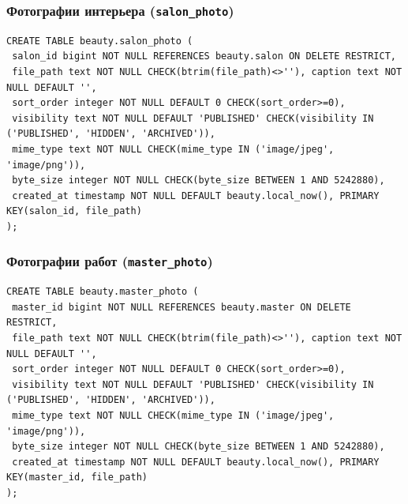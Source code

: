 \documentclass[11pt,a4paper]{article}
\begin{document}
\par\medskip\noindent\begin{minipage}{\linewidth}
\subsubsection*{Фотографии интерьера (\texttt{salon\_\allowbreak{}photo})}
\begin{lstlisting}[style=sql]
CREATE TABLE beauty.salon_photo (
 salon_id bigint NOT NULL REFERENCES beauty.salon ON DELETE RESTRICT,
 file_path text NOT NULL CHECK(btrim(file_path)<>''), caption text NOT NULL DEFAULT '',
 sort_order integer NOT NULL DEFAULT 0 CHECK(sort_order>=0),
 visibility text NOT NULL DEFAULT 'PUBLISHED' CHECK(visibility IN ('PUBLISHED', 'HIDDEN', 'ARCHIVED')),
 mime_type text NOT NULL CHECK(mime_type IN ('image/jpeg', 'image/png')),
 byte_size integer NOT NULL CHECK(byte_size BETWEEN 1 AND 5242880),
 created_at timestamp NOT NULL DEFAULT beauty.local_now(), PRIMARY KEY(salon_id, file_path)
);
\end{lstlisting}
\end{minipage}\par\medskip
\par\medskip\noindent\begin{minipage}{\linewidth}
\subsubsection*{Фотографии работ (\texttt{master\_\allowbreak{}photo})}
\begin{lstlisting}[style=sql]
CREATE TABLE beauty.master_photo (
 master_id bigint NOT NULL REFERENCES beauty.master ON DELETE RESTRICT,
 file_path text NOT NULL CHECK(btrim(file_path)<>''), caption text NOT NULL DEFAULT '',
 sort_order integer NOT NULL DEFAULT 0 CHECK(sort_order>=0),
 visibility text NOT NULL DEFAULT 'PUBLISHED' CHECK(visibility IN ('PUBLISHED', 'HIDDEN', 'ARCHIVED')),
 mime_type text NOT NULL CHECK(mime_type IN ('image/jpeg', 'image/png')),
 byte_size integer NOT NULL CHECK(byte_size BETWEEN 1 AND 5242880),
 created_at timestamp NOT NULL DEFAULT beauty.local_now(), PRIMARY KEY(master_id, file_path)
);
\end{lstlisting}
\end{minipage}\par\medskip
\end{document}
